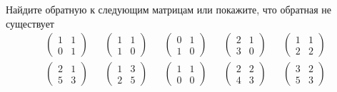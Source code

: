 \begin{exercise}
Найдите обратную к следующим матрицам или покажите, что обратная не существует
\begin{align*}
	&\begin{pmatrix}
		1 & 1 \\ 0 & 1
	\end{pmatrix} &
	&\begin{pmatrix}
		1 & 1 \\ 1 & 0
	\end{pmatrix} &
	&\begin{pmatrix}
		0 & 1 \\ 1 & 0
	\end{pmatrix} &
	&\begin{pmatrix}
		2 & 1 \\ 3 & 0
	\end{pmatrix} &
	&\begin{pmatrix}
		1 & 1 \\ 2 & 2
	\end{pmatrix} \\
	&\begin{pmatrix}
		2 & 1 \\ 5 & 3
	\end{pmatrix} &
	&\begin{pmatrix}
		1 & 3 \\ 2 & 5
	\end{pmatrix} &
	&\begin{pmatrix}
		1 & 1 \\ 0 & 0
	\end{pmatrix} &
	&\begin{pmatrix}
		2 & 2 \\ 4 & 3
	\end{pmatrix} &
	&\begin{pmatrix}
		3 & 2 \\ 5 & 3
	\end{pmatrix} &
\end{align*}
\end{exercise}

